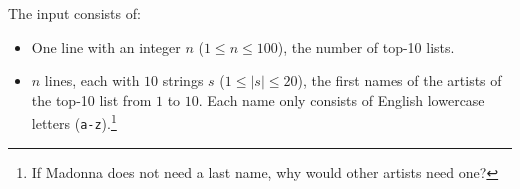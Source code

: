
    The input consists of:
    \begin{itemize}
        \item One line with an integer $n$ ($1\leq n \leq 100$), the number of top-10 lists.
        \item $n$ lines, each with $10$ strings $s$ ($1 \leq |s| \leq 20$),
    the first names of the artists of the top-10 list from $1$ to $10$. Each
    name only consists of English lowercase letters (\texttt{a-z}).\footnote{If Madonna does not need a last name, why would other artists need one?}
    \end{itemize}
